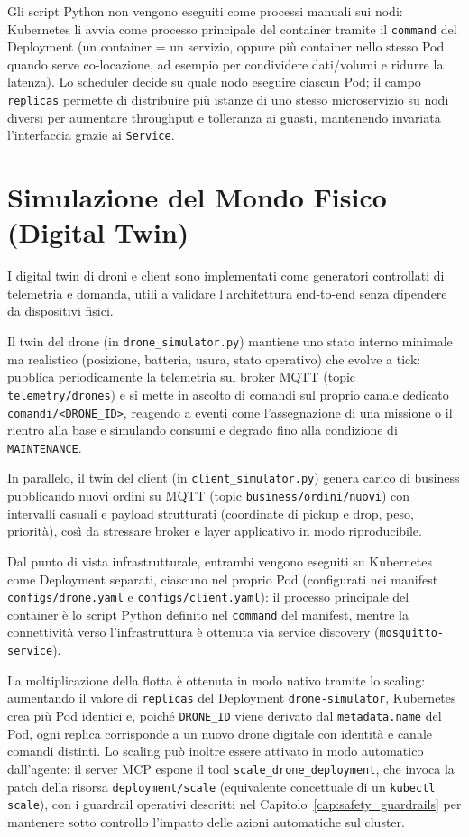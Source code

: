 Gli script Python non vengono eseguiti come processi manuali sui nodi: Kubernetes li avvia come processo principale del container tramite il \texttt{command} del Deployment (un container = un servizio, oppure più container nello stesso Pod quando serve co-locazione, ad esempio per condividere dati/volumi e ridurre la latenza). Lo scheduler decide su quale nodo eseguire ciascun Pod; il campo \texttt{replicas} permette di distribuire più istanze di uno stesso microservizio su nodi diversi per aumentare throughput e tolleranza ai guasti, mantenendo invariata l'interfaccia grazie ai \texttt{Service}.

\section{Simulazione del Mondo Fisico (Digital Twin)}
\label{sec:digital_twin}

I digital twin di droni e client sono implementati come generatori controllati di telemetria e domanda, utili a validare l'architettura end-to-end senza dipendere da dispositivi fisici.

Il twin del drone (in \texttt{drone\_simulator.py}) mantiene uno stato interno minimale ma realistico (posizione, batteria, usura, stato operativo) che evolve a tick: pubblica periodicamente la telemetria sul broker MQTT (topic \texttt{telemetry/drones}) e si mette in ascolto di comandi sul proprio canale dedicato \texttt{comandi/<DRONE\_ID>}, reagendo a eventi come l'assegnazione di una missione o il rientro alla base e simulando consumi e degrado fino alla condizione di \texttt{MAINTENANCE}.

In parallelo, il twin del client (in \texttt{client\_simulator.py}) genera carico di business pubblicando nuovi ordini su MQTT (topic \texttt{business/ordini/nuovi}) con intervalli casuali e payload strutturati (coordinate di pickup e drop, peso, priorità), così da stressare broker e layer applicativo in modo riproducibile.

Dal punto di vista infrastrutturale, entrambi vengono eseguiti su Kubernetes come Deployment separati, ciascuno nel proprio Pod (configurati nei manifest \texttt{configs/drone.yaml} e \texttt{configs/client.yaml}): il processo principale del container è lo script Python definito nel \texttt{command} del manifest, mentre la connettività verso l'infrastruttura è ottenuta via service discovery (\texttt{mosquitto-service}).

La moltiplicazione della flotta è ottenuta in modo nativo tramite lo scaling: aumentando il valore di \texttt{replicas} del Deployment \texttt{drone-simulator}, Kubernetes crea più Pod identici e, poiché \texttt{DRONE\_ID} viene derivato dal \texttt{metadata.name} del Pod, ogni replica corrisponde a un nuovo drone digitale con identità e canale comandi distinti. Lo scaling può inoltre essere attivato in modo automatico dall'agente: il server MCP espone il tool \texttt{scale\_drone\_deployment}, che invoca la patch della risorsa \texttt{deployment/scale} (equivalente concettuale di un \texttt{kubectl scale}), con i guardrail operativi descritti nel Capitolo~\ref{cap:safety_guardrails} per mantenere sotto controllo l'impatto delle azioni automatiche sul cluster.

